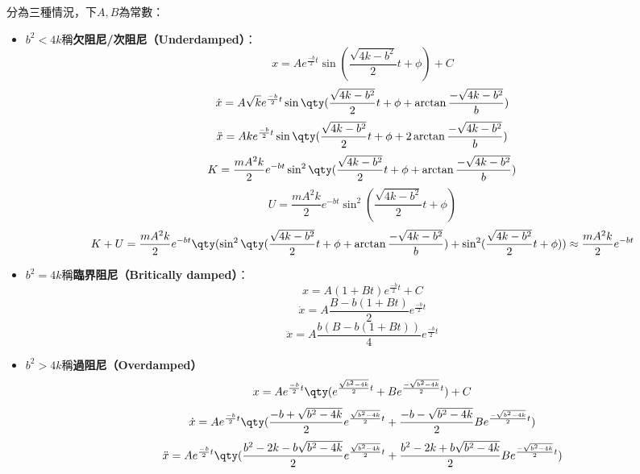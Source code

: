 \documentclass[a4paper,12pt]{article}
\begin{document}
分為三種情況，下$A,B$為常數：
\begin{itemize}
\item $b^2<4k$稱\textbf{欠阻尼/次阻尼（Underdamped）}：
\[x=Ae^{\frac{-b}{2}t}\sin(\frac{\sqrt{4k-b^2}}{2}t+\phi)+C\]
\[\dot{x}=A\sqrt{k}e^{\frac{-b}{2}t}\sin\qty(\frac{\sqrt{4k-b^2}}{2}t+\phi+\arctan\frac{-\sqrt{4k-b^2}}{b})\]
\[\ddot{x}=Ake^{\frac{-b}{2}t}\sin\qty(\frac{\sqrt{4k-b^2}}{2}t+\phi+2\arctan\frac{-\sqrt{4k-b^2}}{b})\]
\[K=\frac{mA^2k}{2}e^{-bt}\sin^2\qty(\frac{\sqrt{4k-b^2}}{2}t+\phi+\arctan\frac{-\sqrt{4k-b^2}}{b})\]
\[U=\frac{mA^2k}{2}e^{-bt}\sin^2(\frac{\sqrt{4k-b^2}}{2}t+\phi)\]
\[K+U=\frac{mA^2k}{2}e^{-bt}\qty(\sin^2\qty(\frac{\sqrt{4k-b^2}}{2}t+\phi+\arctan\frac{-\sqrt{4k-b^2}}{b})+\sin^2(\frac{\sqrt{4k-b^2}}{2}t+\phi))\approx\frac{mA^2k}{2}e^{-bt}\]
\item $b^2=4k$稱\textbf{臨界阻尼（Britically damped）}：
\[x=A(1+Bt)e^{\frac{-b}{2}t}+C\]
\[\dot{x}=A\frac{B-b(1+Bt)}{2}e^{\frac{-b}{2}t}\]
\[\ddot{x}=A\frac{b(B-b(1+Bt))}{4}e^{\frac{-b}{2}t}\]
\item $b^2>4k$稱\textbf{過阻尼（Overdamped）}
\[x=Ae^{\frac{-b}{2}t}\qty(e^{\frac{\sqrt{b^2-4k}}{2}t}+Be^{\frac{-\sqrt{b^2-4k}}{2}t})+C\]
\[\dot{x}=Ae^{\frac{-b}{2}t}\qty(\frac{-b+\sqrt{b^2-4k}}{2}e^{\frac{\sqrt{b^2-4k}}{2}t}+\frac{-b-\sqrt{b^2-4k}}{2}Be^{\frac{-\sqrt{b^2-4k}}{2}t})\]
\[\ddot{x}=Ae^{\frac{-b}{2}t}\qty(\frac{b^2-2k-b\sqrt{b^2-4k}}{2}e^{\frac{\sqrt{b^2-4k}}{2}t}+\frac{b^2-2k+b\sqrt{b^2-4k}}{2}Be^{\frac{-\sqrt{b^2-4k}}{2}t})\]
\end{itemize}
\end{document}
